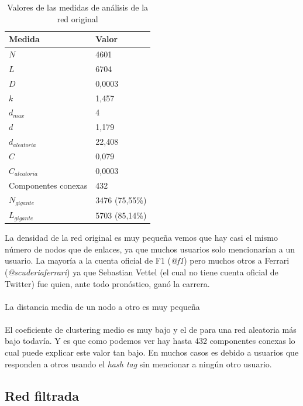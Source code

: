 \begin{table}[H]
	\centering
	\caption{Valores de las medidas de análisis de la red original}
	\label{tab:medidas-original}
	\begin{tabular}{| l | l |}
		\hline
		Medida                & Valor          \\ 
		\hline
		$N$                   & 4601           \\
		$L$                   & 6704           \\
		$D$                   & 0,0003         \\
		$k$                   & 1,457          \\
		$d_{max}$             & 4              \\
		$d$                   & 1,179          \\
		$d_{aleatoria}$       & 22,408         \\
		$C$                   & 0,079          \\
		$C_{aleatoria}$       & 0,0003         \\
		Componentes conexas   & 432            \\ 
		$N_{gigante}$         & 3476 (75,55\%) \\ 
		$L_{gigante}$         & 5703 (85,14\%) \\ 
		\hline
	\end{tabular}
\end{table}

La densidad de la red original es muy pequeña vemos que hay casi el mismo número de nodos que de enlaces, ya que muchos usuarios solo mencionarían a un usuario. La mayoría a la cuenta oficial de F1 (\textit{@f1}) pero muchos otros a Ferrari (\textit{@scuderiaferrari}) ya que Sebastian Vettel (el cual no tiene cuenta oficial de Twitter) fue quien, ante todo pronóstico, ganó la carrera.
\\ \\
La distancia media de un nodo a otro es muy pequeña
\\ \\
El coeficiente de clustering medio es muy bajo y el de para una red aleatoria más bajo todavía. Y es que como podemos ver hay hasta 432 componentes conexas lo cual puede explicar este valor tan bajo. En muchos casos es debido a usuarios que responden a otros usando el \textit{hash tag} sin mencionar a ningún otro usuario.

\subsection{Red filtrada}

